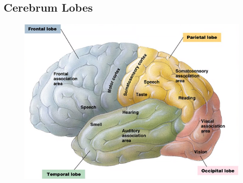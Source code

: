 \documentclass[a4paper,12pt]{article}
\begin{document}
\subsection{Cerebrum Lobes}
\begin{figure}[H]
    \centering
    \includegraphics[width=\textwidth]{lobes}
\end{figure}
\end{document}
